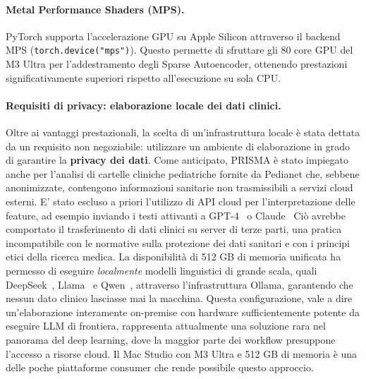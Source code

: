 \paragraph{Metal Performance Shaders (MPS).}
PyTorch supporta l'accelerazione GPU su Apple Silicon attraverso il backend MPS (\texttt{torch.device("mps")}). Questo permette di sfruttare gli 80 core GPU del M3 Ultra per l'addestramento degli Sparse Autoencoder, ottenendo prestazioni significativamente superiori rispetto all'esecuzione su sola CPU.
\paragraph{Requisiti di privacy: elaborazione locale dei dati clinici.}
Oltre ai vantaggi prestazionali, la scelta di un'infrastruttura locale è stata dettata da un requisito non negoziabile: 
utilizzare un ambiente di elaborazione in grado di garantire
la \textbf{privacy dei dati}. Come anticipato, PRISMA è stato impiegato anche per l'analisi di cartelle cliniche pediatriche fornite da Pedianet che, sebbene anonimizzate, contengono informazioni 
sanitarie
non trasmissibili a servizi cloud esterni.
%
E' stato escluso a priori 
l'utilizzo di API cloud per l'interpretazione delle feature, ad esempio inviando i testi attivanti a GPT-4~\parencite{openai2023gpt4} o Claude~\parencite{anthropic2024claude}
Ciò avrebbe
comportato il trasferimento di dati clinici su server di terze parti, una pratica incompatibile con le normative sulla protezione dei dati sanitari e con i principi etici della ricerca medica. La disponibilità di 512 GB di memoria unificata ha permesso di eseguire \textit{localmente} modelli linguistici di grande scala, quali DeepSeek~\parencite{deepseekai2024deepseekv3}, Llama~\parencite{touvron2023llama} e Qwen~\parencite{bai2023qwen}, attraverso 
l'infrastruttura
Ollama, garantendo che nessun dato clinico lasciasse mai la macchina.
Questa configurazione, vale a dire un'elaborazione interamente on-premise con hardware sufficientemente potente da eseguire LLM di frontiera, rappresenta attualmente una soluzione rara nel panorama del deep learning, dove la maggior parte dei workflow 
presuppone
l'accesso a risorse cloud. Il Mac Studio con M3 Ultra e 512 GB di memoria è una delle poche piattaforme consumer che rende possibile questo approccio.


